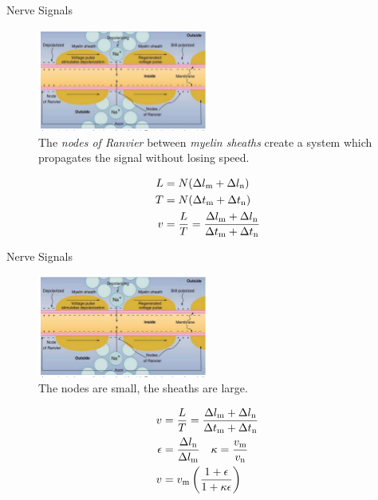 \documentclass{beamer}
\begin{document}
\begin{frame}{Nerve Signals}
\begin{figure}
\centering
\includegraphics[width=0.5\textwidth]{figures/nerve5.png}
\caption{\label{fig:nerve4a} The \textit{nodes of Ranvier} between \textit{myelin sheaths} create a system which propagates the signal without losing speed.}
\end{figure}
\small
\begin{align}
L &= N(\Delta l_{\rm m} + \Delta l_{\rm n}) \\
T &= N(\Delta t_{\rm m} + \Delta t_{\rm n}) \\ 
v &= \frac{L}{T} = \frac{\Delta l_{\rm m} + \Delta l_{\rm n}}{\Delta t_{\rm m} + \Delta t_{\rm n}}
\end{align}
\end{frame}

\begin{frame}{Nerve Signals}
\begin{figure}
\centering
\includegraphics[width=0.5\textwidth]{figures/nerve5.png}
\caption{\label{fig:nerve4b} The nodes are small, the sheaths are large.}
\end{figure}
\small
\begin{align}
v &= \frac{L}{T} = \frac{\Delta l_{\rm m} + \Delta l_{\rm n}}{\Delta t_{\rm m} + \Delta t_{\rm n}} \\
\epsilon &= \frac{\Delta l_{\rm n}}{\Delta l_{\rm m}} ~~~ \kappa = \frac{v_{\rm m}}{v_{\rm n}} \\
v &= v_{\rm m} \left( \frac{1+\epsilon}{1+\kappa\epsilon} \right)
\end{align}
\end{frame}
\end{document}
